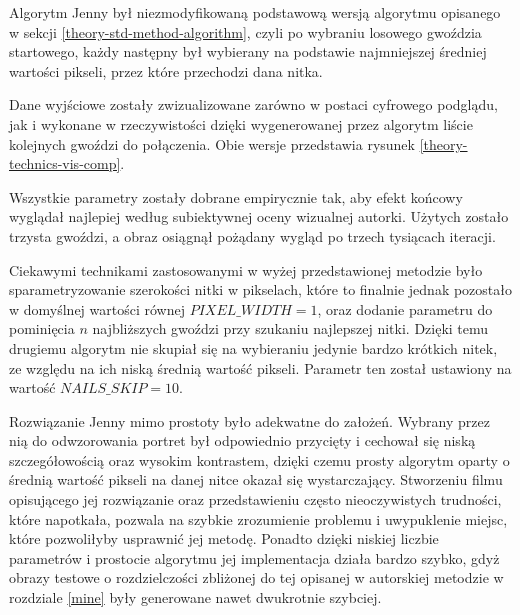         Algorytm Jenny był niezmodyfikowaną podstawową wersją algorytmu opisanego w sekcji \ref{theory-std-method-algorithm}, czyli po wybraniu losowego gwoździa startowego, każdy następny był wybierany na podstawie najmniejszej średniej wartości pikseli, przez które przechodzi dana nitka. 
        
        Dane wyjściowe zostały zwizualizowane zarówno w postaci cyfrowego podglądu, jak i wykonane w rzeczywistości dzięki wygenerowanej przez algorytm liście kolejnych gwoździ do połączenia. Obie wersje przedstawia rysunek \ref{theory-technics-vis-comp}.
        
        Wszystkie parametry zostały dobrane empirycznie tak, aby efekt końcowy wyglądał najlepiej według subiektywnej oceny wizualnej autorki. Użytych zostało trzysta gwoździ, a obraz osiągnął pożądany wygląd po trzech tysiącach iteracji.
        
        Ciekawymi technikami zastosowanymi w wyżej przedstawionej metodzie było sparametryzowanie szerokości nitki w pikselach, które to finalnie jednak pozostało w domyślnej wartości równej \(PIXEL\_WIDTH = 1\), oraz dodanie parametru do pominięcia \(n\) najbliższych gwoździ przy szukaniu najlepszej nitki. Dzięki temu drugiemu algorytm nie skupiał się na wybieraniu jedynie bardzo krótkich nitek, ze względu na ich niską średnią wartość pikseli. Parametr ten został ustawiony na wartość \(NAILS\_SKIP = 10\). 

        Rozwiązanie Jenny mimo prostoty było adekwatne do założeń. Wybrany przez nią do odwzorowania portret był odpowiednio przycięty i cechował się niską szczegółowością oraz wysokim kontrastem, dzięki czemu prosty algorytm oparty o średnią wartość pikseli na danej nitce okazał się wystarczający. Stworzeniu filmu opisującego jej rozwiązanie oraz przedstawieniu często nieoczywistych trudności, które napotkała, pozwala na szybkie zrozumienie problemu i uwypuklenie miejsc, które pozwoliłyby usprawnić jej metodę. Ponadto dzięki niskiej liczbie parametrów i prostocie algorytmu jej implementacja działa bardzo szybko, gdyż obrazy testowe o rozdzielczości zbliżonej do tej opisanej w autorskiej metodzie w rozdziale \ref{mine} były generowane nawet dwukrotnie szybciej.
        

